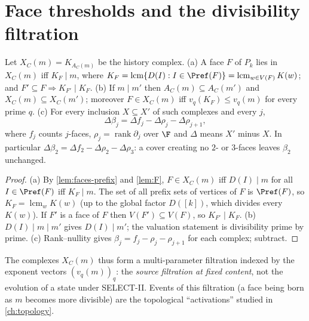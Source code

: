 \section{Face thresholds and the divisibility filtration}
\begin{theorem}\label{thm:face-threshold}\label{thm:filtration}
Let $X_C(m)=K_{A_C(m)}$ be the history complex. (a) A face $F$ of $P_k$ lies in $X_C(m)$ iff $K_F\mid m$, where $K_F=\operatorname{lcm}\{D(I):I\in\Pref(F)\}=\operatorname{lcm}_{w\in V(F)}K(w)$; and $F'\subseteq F\Rightarrow K_{F'}\mid K_F$. (b) If $m\mid m'$ then $A_C(m)\subseteq A_C(m')$ and $X_C(m)\subseteq X_C(m')$; moreover $F\in X_C(m)$ iff $v_q(K_F)\le v_q(m)$ for every prime $q$. (c) For every inclusion $X\subseteq X'$ of such complexes and every $j$,
\[
\Delta\beta_j=\Delta f_j-\Delta\rho_j-\Delta\rho_{j+1},
\]
where $f_j$ counts $j$-faces, $\rho_j=\operatorname{rank}\partial_j$ over $\F$ and $\Delta$ means $X'$ minus $X$. In particular $\Delta\beta_2=\Delta f_2-\Delta\rho_2-\Delta\rho_3$: a cover creating no $2$- or $3$-faces leaves $\beta_2$ unchanged.
\end{theorem}
\begin{proof}
(a) By \cref{lem:faces-prefix} and \cref{lem:F}, $F\in X_C(m)$ iff $D(I)\mid m$ for all $I\in\Pref(F)$ iff $K_F\mid m$. The set of all prefix sets of vertices of $F$ is $\Pref(F)$, so $K_F=\operatorname{lcm}_wK(w)$ (up to the global factor $D([k])$, which divides every $K(w)$). If $F'$ is a face of $F$ then $V(F')\subseteq V(F)$, so $K_{F'}\mid K_F$. (b) $D(I)\mid m\mid m'$ gives $D(I)\mid m'$; the valuation statement is divisibility prime by prime. (c) Rank--nullity gives $\beta_j=f_j-\rho_j-\rho_{j+1}$ for each complex; subtract.
\end{proof}
The complexes $X_C(m)$ thus form a multi-parameter filtration indexed by the exponent vectors $(v_q(m))_q$: the \emph{source filtration at fixed content}, not the evolution of a state under SELECT-II. Events of this filtration (a face being born as $m$ becomes more divisible) are the topological ``activations'' studied in \cref{ch:topology}.

